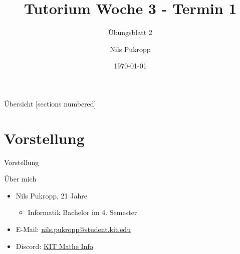 \documentclass[aspectratio=169]{beamer}
\title{\color{classcolor}Tutorium Woche 3 - Termin 1}
\subtitle{Übungsblatt 2}
\date{\today}
\author{Nils Pukropp}
\institute{INSTITUT FÜR PROGRAMMSTRUKTUREN UND DATENORGANISATION}
\begin{document}
\maketitle

\begin{frame}{Übersicht}
  [sections numbered]
  \tableofcontents[hideallsubsections]
\end{frame}

\section{Vorstellung}
\begin{frame}[fragile]{Vorstellung}
  \begin{block}{Über mich}
  \begin{itemize}
    \item Nils Pukropp, 21 Jahre
    \begin{itemize}
      \item Informatik Bachelor im 4. Semester
    \end{itemize}
    \item E-Mail: \href{mailto:nils.pukropp@student.kit.edu}{nils.pukropp@student.kit.edu}
    \item Discord: \href{https://discord.gg/6GpaFE8w4y}{KIT Mathe Info}
  \end{itemize}
\end{block}
\end{frame}
\end{document}
